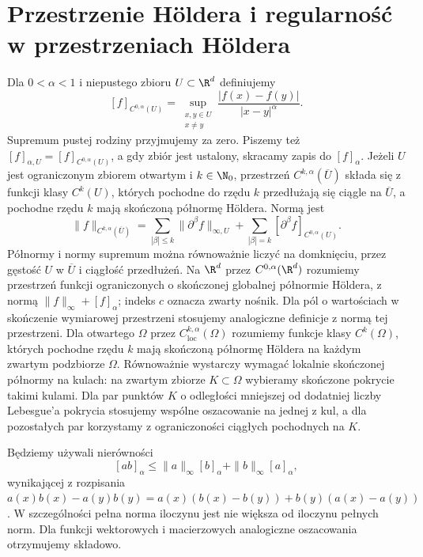 \section{Przestrzenie Höldera i regularność w przestrzeniach Höldera}
\begin{definicja}
\label{def:pde16-holder}
Dla $0<\alpha<1$ i niepustego zbioru $U\subset\R^d$
definiujemy
\[
 [f]_{C^{0,\alpha}(U)}=
 \sup_{\substack{x,y\in U\\x\ne y}}
 \frac{|f(x)-f(y)|}{|x-y|^\alpha}.
\]
Supremum pustej rodziny przyjmujemy za zero.
Piszemy też $[f]_{\alpha,U}=[f]_{C^{0,\alpha}(U)}$,
a gdy zbiór jest ustalony, skracamy zapis do $[f]_\alpha$.
Jeżeli $U$ jest ograniczonym zbiorem otwartym i
$k\in\N_0$, przestrzeń $C^{k,\alpha}(\overline U)$
składa się z funkcji klasy $C^k(U)$, których pochodne
do rzędu $k$ przedłużają się ciągle na $\overline U$,
a pochodne rzędu $k$ mają skończoną półnormę Höldera.
Normą jest
\[
 \|f\|_{C^{k,\alpha}(\overline U)}
 =\sum_{|\beta|\le k}\|\partial^\beta f\|_{\infty,U}
 +\sum_{|\beta|=k}[\partial^\beta f]_{C^{0,\alpha}(U)}.
\]
Półnormy i normy supremum można równoważnie liczyć
na domknięciu, przez gęstość $U$ w $\overline U$
i ciągłość przedłużeń. Na $\R^d$ przez
$C^{0,\alpha}(\R^d)$ rozumiemy przestrzeń funkcji
ograniczonych o skończonej globalnej półnormie Höldera,
z normą $\|f\|_\infty+[f]_\alpha$; indeks $c$
oznacza zwarty nośnik. Dla pól o wartościach w skończenie
wymiarowej przestrzeni stosujemy analogiczne definicje
z normą tej przestrzeni.
Dla otwartego $\Omega$ przez
$C^{k,\alpha}_{\mathrm{loc}}(\Omega)$ rozumiemy funkcje
klasy $C^k(\Omega)$, których pochodne rzędu $k$
mają skończoną półnormę Höldera na każdym zwartym
podzbiorze $\Omega$. Równoważnie wystarczy wymagać
lokalnie skończonej półnormy na kulach: na zwartym
zbiorze $K\subset\Omega$ wybieramy skończone pokrycie
takimi kulami. Dla par punktów $K$ o odległości
mniejszej od dodatniej liczby Lebesgue'a pokrycia
stosujemy wspólne oszacowanie na jednej z kul,
a dla pozostałych par korzystamy z ograniczoności
ciągłych pochodnych na $K$.
\end{definicja}

Będziemy używali nierówności
\[
 [ab]_\alpha\le\|a\|_\infty[b]_\alpha+
                    \|b\|_\infty[a]_\alpha,
\]
wynikającej z rozpisania
$a(x)b(x)-a(y)b(y)=a(x)(b(x)-b(y))+
b(y)(a(x)-a(y))$. W szczególności pełna norma
iloczynu jest nie większa od iloczynu pełnych norm.
Dla funkcji wektorowych i macierzowych analogiczne
oszacowania otrzymujemy składowo.

